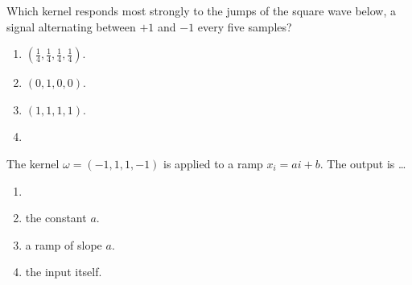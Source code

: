 \documentclass[11pt, a4paper]{exam}
\begin{document}
\begin{quiz}
    \item Which kernel responds most strongly to the jumps of the square wave below, a signal alternating between $+1$ and $-1$ every five samples?
    \begin{center}
    \end{center}
    \begin{enumerate}[label=$\bigcirc$]
        \item $(\frac{1}{4}, \frac{1}{4}, \frac{1}{4}, \frac{1}{4})$.
        \item $(0, 1, 0, 0)$.
        \item $(1, 1, 1, 1)$.
        \item {}
    \end{enumerate}

    \item The kernel $\omega = (-1, 1, 1, -1)$ is applied to a ramp $x_i = a i + b$. The output is \ldots
    \begin{enumerate}[label=$\bigcirc$]
        \item {}
        \item the constant $a$.
        \item a ramp of slope $a$.
        \item the input itself.
    \end{enumerate}
\end{quiz}
\end{document}
